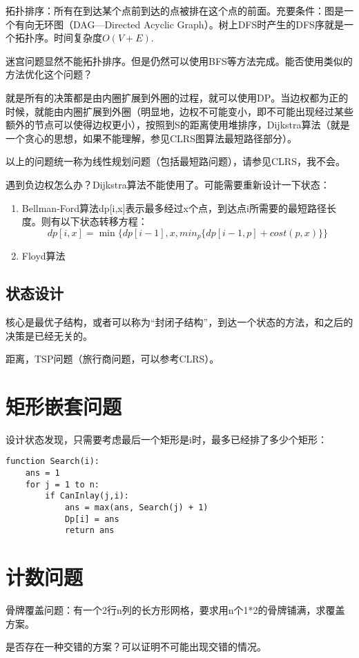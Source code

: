 \documentclass{article}
\begin{document}
拓扑排序：所有在到达某个点前到达的点被排在这个点的前面。充要条件：图是一个有向无环图（DAG---Directed Acyclic Graph）。树上DFS时产生的DFS序就是一个拓扑序。时间复杂度$O(V+E)$.

迷宫问题显然不能拓扑排序。但是仍然可以使用BFS等方法完成。能否使用类似的方法优化这个问题？

就是所有的决策都是由内圈扩展到外圈的过程，就可以使用DP。当边权都为正的时候，就能由内圈扩展到外圈（明显地，边权不可能变小，即不可能出现经过某些额外的节点可以使得边权更小），按照到S的距离使用堆排序，Dijkstra算法（就是一个贪心的思想，如果不能理解，参见CLRS图算法最短路径部分）。

以上的问题统一称为线性规划问题（包括最短路问题），请参见CLRS，我不会。

遇到负边权怎么办？Dijkstra算法不能使用了。可能需要重新设计一下状态：
\begin{enumerate}
\item{Bellman-Ford算法}dp[i,x]表示最多经过x个点，到达点i所需要的最短路径长度。则有以下状态转移方程：
\begin{equation*}
dp[i,x]=\min\{dp[i-1],x,min_p\{dp[i-1,p]+cost(p,x)\}\}
\end{equation*}
\item{Floyd算法}
\end{enumerate}
\subsection{状态设计}
核心是最优子结构，或者可以称为“封闭子结构”，到达一个状态的方法，和之后的决策是已经无关的。

距离，TSP问题（旅行商问题，可以参考CLRS）。
\section{矩形嵌套问题}
设计状态发现，只需要考虑最后一个矩形是i时，最多已经排了多少个矩形：
\begin{verbatim}
function Search(i):
    ans = 1
    for j = 1 to n:
        if CanInlay(j,i):
            ans = max(ans, Search(j) + 1)
            Dp[i] = ans
            return ans
\end{verbatim}
\section{计数问题}
骨牌覆盖问题：有一个2行n列的长方形网格，要求用n个1*2的骨牌铺满，求覆盖方案。

是否存在一种交错的方案？可以证明不可能出现交错的情况。
\end{document}

